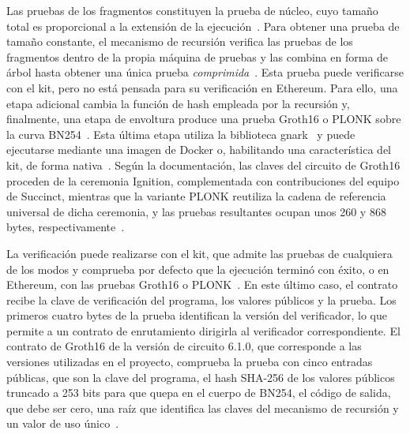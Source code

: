 Las pruebas de los fragmentos constituyen la prueba de núcleo, cuyo tamaño total es proporcional a
la extensión de la ejecución~\cite{sp1docsv6}. Para obtener una prueba de tamaño constante, el
mecanismo de recursión verifica las pruebas de los fragmentos dentro de la propia máquina de pruebas
y las combina en forma de árbol hasta obtener una única prueba \textit{comprimida}~\cite{sp1docsv6}.
Esta prueba puede verificarse con el kit, pero no está pensada para su verificación en Ethereum.
Para ello, una etapa adicional cambia la función de hash empleada por la recursión y, finalmente,
una etapa de envoltura produce una prueba Groth16 o PLONK sobre la curva BN254~\cite{sp1docsv6,
sp1repo}. Esta última etapa utiliza la biblioteca gnark~\cite{gnarkrepo} y puede ejecutarse mediante
una imagen de Docker o, habilitando una característica del kit, de forma nativa~\cite{sp1repo}.
Según la documentación, las claves del circuito de Groth16 proceden de la ceremonia Ignition,
complementada con contribuciones del equipo de Succinct, mientras que la variante PLONK reutiliza la
cadena de referencia universal de dicha ceremonia, y las pruebas resultantes ocupan unos 260 y
868 bytes, respectivamente~\cite{sp1docsv6}.

La verificación puede realizarse con el kit, que admite las pruebas de cualquiera de los modos y
comprueba por defecto que la ejecución terminó con éxito, o en Ethereum, con las pruebas Groth16 o
PLONK~\cite{sp1repo, sp1docsv6}. En este último caso, el contrato recibe la clave de verificación
del programa, los valores públicos y la prueba. Los primeros cuatro bytes de la prueba identifican la
versión del verificador, lo que permite a un contrato de enrutamiento dirigirla al verificador
correspondiente. El contrato de Groth16 de la versión de circuito 6.1.0, que corresponde a las
versiones utilizadas en el proyecto, comprueba la prueba con cinco entradas públicas, que son la
clave del programa, el hash SHA-256 de los valores públicos truncado a 253 bits para que quepa en el
cuerpo de BN254, el código de salida, que debe ser cero, una raíz que identifica las claves del
mecanismo de recursión y un valor de uso único~\cite{sp1contracts}.

